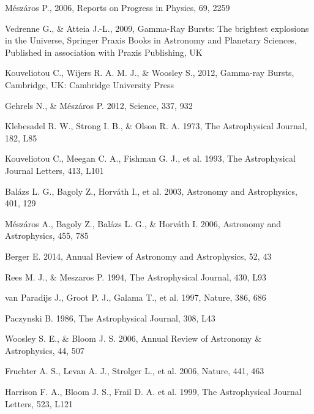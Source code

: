 \documentclass[12pt, a4paper,titlepage]{article}
\numberwithin{equation}{section}
\numberwithin{figure}{section}
\begin{document}
\begin{thebibliography}{99}

 Mészáros P., 2006, Reports on Progress in Physics, 69, 2259

 Vedrenne G., \& Atteia J.-L., 2009, Gamma-Ray Bursts: The brightest explosions in the Universe,
Springer Praxis Books in Astronomy and Planetary Sciences, Published in association with Praxis
Publishing, UK

 Kouveliotou C., Wijers R. A. M. J., \& Woosley S., 2012, Gamma-ray Bursts, Cambridge, UK:
Cambridge University Press

 Gehrels N., \& Mészáros P. 2012, Science, 337, 932

 Klebesadel R. W., Strong I. B., \& Olson R. A. 1973, The Astrophysical Journal, 182, L85

 Kouveliotou C., Meegan C. A., Fishman G. J., et al. 1993, The Astrophysical Journal Letters, 413, L101

 Balázs L. G., Bagoly Z., Horváth I., et al. 2003, Astronomy and Astrophysics, 401, 129

 Mészáros A., Bagoly Z., Balázs L. G., \& Horváth I. 2006, Astronomy and Astrophysics, 455, 785

 Berger E. 2014, Annual Review of Astronomy and Astrophysics, 52, 43

 Rees M. J., \& Meszaros P. 1994, The Astrophysical Journal, 430, L93

 van Paradijs J., Groot P. J., Galama T., et al. 1997, Nature, 386, 686

 Paczynski B. 1986, The Astrophysical Journal, 308, L43

 Woosley S. E., \& Bloom J. S. 2006, Annual Review of Astronomy \& Astrophysics, 44, 507

 Fruchter A. S., Levan A. J., Strolger L., et al. 2006, Nature, 441, 463

 Harrison F. A., Bloom J. S., Frail D. A. et al. 1999, The Astrophysical Journal Letters, 523, L121


\end{thebibliography}
\end{document}
